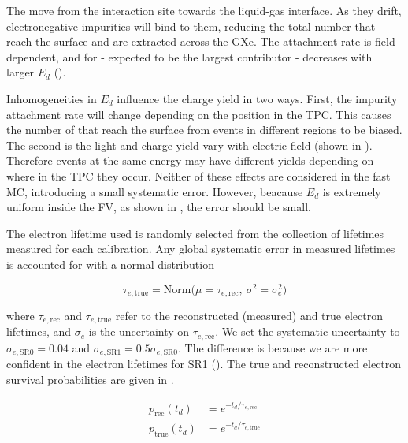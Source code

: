 The \electron move from the interaction site towards the liquid-gas interface.  As they drift, electronegative
impurities will bind to them, reducing the total number that reach the surface and are extracted across the GXe.  The attachment rate
is field-dependent, and for  - expected to be the largest contributor - decreases with larger $E_d$
().

Inhomogeneities in $E_d$ influence the charge yield in two ways.  First, the impurity attachment rate will change depending on the
position in the TPC.   This causes the number of \electron that reach the surface from events in different regions to be
biased.  The second is the light and charge yield vary with electric field (shown in
).  Therefore events at the same energy may have
different yields depending on where in the TPC they occur.  Neither of these effects are considered
in the fast MC, introducing a small systematic error.  However, beacause $E_d$ is extremely uniform inside the FV, as shown in
, the error should be small.

The electron lifetime used is randomly selected from the collection of lifetimes measured for each calibration.  Any global
systematic error in measured lifetimes  is accounted for with a normal distribution

\begin{equation}
\tau_{e, \mathrm{true}} = \mathrm{Norm} \big( \mu = \tau_{e, \mathrm{rec}},\ \sigma^2 = \sigma_{e}^2
\big)
\label{eq:er_nr_calibrations_parameter_determ_det_phys_elife_true}
\end{equation}

\noindent where $\tau_{e, \mathrm{rec}}$ and $\tau_{e, \mathrm{true}}$ refer to the reconstructed (measured) and true electron
lifetimes, and $\sigma_e$ is the uncertainty on $\tau_{e, \mathrm{rec}}$.  We set the systematic uncertainty to 
$\sigma_{e, \mathrm{SR0}} = 0.04$ and $\sigma_{e, \mathrm{SR1}} = 0.5 \sigma_{e, \mathrm{SR0}}$.  The difference is because we are
more confident in the electron lifetimes for SR1 ().  The true and reconstructed electron
survival probabilities are given in .

\vspace{-20pt}

\begin{subequations}
\begin{align}
p_{\mathrm{rec}} (t_d) &= e^{-t_d / \tau_{e, \mathrm{rec}}} \\
p_{\mathrm{true}} (t_d) &= e^{-t_d / \tau_{e, \mathrm{true}}}
\end{align}
\label{eq:er_nr_calibrations_parameter_determ_det_phys_prob_elifetime}
\end{subequations}


